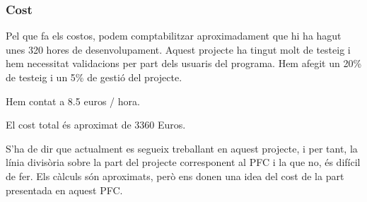 \subsubsection{Cost} %
\label{ssub:Cost}

Pel que fa els costos, podem comptabilitzar aproximadament que hi ha
hagut unes 320 hores de desenvolupament.  Aquest projecte ha tingut
molt de testeig i hem necessitat validacions per part dels usuaris del programa.
Hem afegit un 20\% de testeig i un 5\% de gestió del projecte.

Hem contat a 8.5 euros / hora.

El cost total és aproximat de 3360 Euros.

S'ha de dir que actualment es segueix treballant en aquest projecte, i
per tant, la línia divisòria sobre la part del projecte corresponent
al PFC i la que no, és difícil de fer.  Els càlculs són aproximats,
però ens donen una idea del cost de la part presentada en aquest PFC.


%
